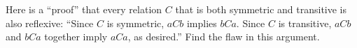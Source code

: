 \documentclass[../main.tex]{subfiles}
\begin{document}
\problem{}\label{s3p3}

Here is a ``proof'' that every relation \(C\) that is both symmetric and
transitive is also reflexive: ``Since \(C\) is symmetric, \(aCb\) implies
\(bCa\). Since \(C\) is transitive, \(aCb\) and \(bCa\) together imply \(aCa\),
as desired.'' Find the flaw in this argument.

\todo{}
%
\end{document}
